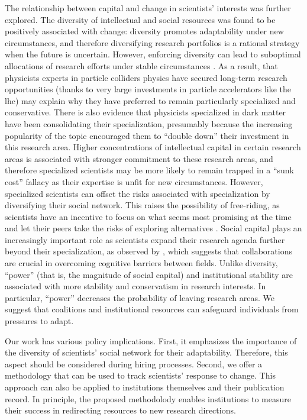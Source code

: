\documentclass{article}
\begin{document}
The relationship between capital and change in scientists' interests was further explored. The diversity of intellectual and social resources was found to be positively associated with change: diversity promotes adaptability under new circumstances, and therefore diversifying research portfolios is a rational strategy when the future is uncertain. However, enforcing diversity can lead to suboptimal allocations of research efforts under stable circumstances \citep{Schimmelpfennig2021}. As a result, that physicists experts in particle colliders physics have secured long-term research opportunities (thanks to very large investments in particle accelerators like the \gls{lhc}) may explain why they have preferred to remain particularly specialized and conservative. There is also evidence that physicists specialized in dark matter have been consolidating their specialization, presumably because the increasing popularity of the topic encouraged them to ``double down'' their investment in this research area. Higher concentrations of intellectual capital in certain research areas is associated with stronger commitment to these research areas, and therefore specialized scientists may be more likely to remain trapped in a ``sunk cost'' fallacy as their expertise is unfit for new circumstances. However, specialized scientists can offset the risks associated with specialization by diversifying their social network. This raises the possibility of free-riding, as scientists have an incentive to focus on what seems most promising at the time and let their peers take the risks of exploring alternatives \citep{Kummerfeld2016}. Social capital plays an increasingly important role as scientists expand their research agenda further beyond their specialization, as observed by \citealt{Tripodi2020}, which suggests that collaborations are crucial in overcoming cognitive barriers between fields. Unlike diversity, ``power'' (that is, the magnitude of social capital) and institutional stability are associated with more stability and conservatism in research interests. In particular, ``power'' decreases the probability of leaving research areas. We suggest that coalitions and institutional resources can safeguard individuals from pressures to adapt. 

Our work has various policy implications. First, it emphasizes the importance of the diversity of scientists' social network for their adaptability. Therefore, this aspect should be considered during hiring processes. Second, we offer a methodology that can be used to track scientists' response to change. This approach can also be applied to institutions themselves and their publication record. In principle, the proposed methodolody enables institutions to measure their success in redirecting resources to new research directions.
\end{document}
